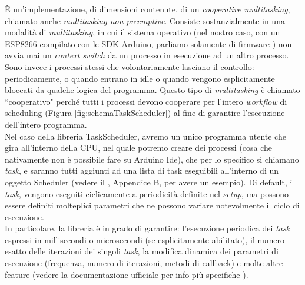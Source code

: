 \documentclass[12pt,a4paper]{report}
\begin{document}
È un'implementazione, di dimensioni contenute, di un \textit{cooperative multitasking}, chiamato anche \textit{multitasking non-preemptive}.
Consiste sostanzialmente in una modalità di \textit{multitasking}, in cui il sistema operativo (nel nostro caso, con un ESP8266 compilato con le SDK Arduino, parliamo solamente di firmware \cite{wikiesp8266}) non avvia mai un \textit{context switch} da un processo in esecuzione ad un altro processo. Sono invece i processi stessi che volontariamente lasciano il controllo: periodicamente, o quando entrano in idle o quando vengono esplicitamente bloccati da qualche logica del programma. Questo tipo di \textit{multitasking} è chiamato ``cooperativo" perché tutti i processi devono cooperare per l'intero \textit{workflow} di scheduling (Figura \ref{fig:schemaTaskScheduler}) al fine di garantire l'esecuzione dell'intero programma.\\
Nel caso della libreria TaskScheduler, avremo un unico programma utente che gira all'interno della CPU, nel quale potremo creare dei processi (cosa che nativamente non è possibile fare su Arduino Ide), che per lo specifico si chiamano \textit{task}, e saranno tutti aggiunti ad una lista di task eseguibili all'interno di un oggetto Scheduler (vedere il , Appendice B, per avere un esempio). Di default, i \textit{task}, vengono eseguiti ciclicamente a periodicità definite nel \textit{setup}, ma possono essere definiti molteplici parametri che ne possono variare notevolmente il ciclo di esecuzione.\\ 
In particolare, la libreria è in grado di garantire: l'esecuzione periodica dei \textit{task} espressi in millisecondi o microsecondi (se esplicitamente abilitato), il numero esatto delle iterazioni dei singoli \textit{task}, la modifica dinamica dei parametri di esecuzione (frequenza, numero di iterazioni, metodi di callback) e molte altre feature (vedere la documentazione ufficiale per info più specifiche \cite{taskScheduler}). 
\end{document}
